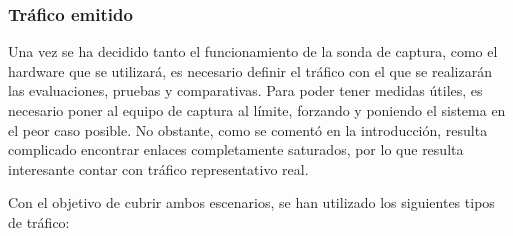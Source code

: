 \subsubsection{Tráfico emitido}

Una vez se ha decidido tanto el funcionamiento de la sonda de captura, como el hardware que se utilizará, es necesario definir el tráfico con el que se realizarán las evaluaciones, pruebas y comparativas. Para poder tener medidas útiles, es necesario poner al equipo de captura al límite, forzando y poniendo el sistema en el peor caso posible. No obstante, como se comentó en la introducción, resulta complicado encontrar enlaces completamente saturados, por lo que resulta interesante contar con tráfico representativo real.

Con el objetivo de cubrir ambos escenarios, se han utilizado los siguientes tipos de tráfico:

